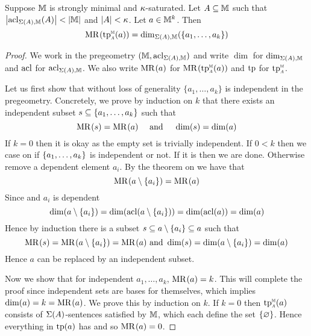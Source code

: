 \begin{prop}
    Suppose $\mathbb{M}$ is strongly minimal and $\kappa$-saturated. 
    Let $A \subseteq \mathbb{M}$ such that $\left\vert \operatorname{acl}_{\Sigma(A),\mathbb{M}}(A) \right\vert < \left\vert \mathbb{M} \right\vert$ 
    and $\left\vert A \right\vert < \kappa$.
    Let $a \in \mathbb{M}^k$. Then 
    \[\MR{}{\subintp{A}{\M}{\tp}(a)} = \dim_{\Si(A),\M}(\{a_1,\dots,a_k\})\]
\end{prop}
\begin{proof}
    We work in the pregeometry $(\mathbb{M},\operatorname{acl}_{\Sigma(A),\mathbb{M}})$ and write 
    $\dim$ for $\dim_{\Sigma(A),\mathbb{M}}$ and $\operatorname{acl}$ for $\operatorname{acl}_{\Sigma(A),\mathbb{M}}$.
    We also write $\mathrm{MR}^{}(a)$ for $\MR{}{\subintp{A}{\M}{\tp}(a)}$ and
    $\operatorname{tp}$ for $\subintp{A}{\M}{\tp}$.

    Let us first show that without loss of generality 
    $\{a_1,\dots,a_k\}$ is independent in the pregeometry.
    Concretely, we prove by induction on $k$ that there exists an independent
    subset $s \subseteq \left\{a_1,\dots,a_k\right\}$ such that 
    \[\mathrm{MR}^{}(s) = \mathrm{MR}^{}(a) \quad \text{ and } \quad \dim(s) = \dim(a)\]
    If $k = 0$ then it is okay as the empty set is trivially independent.
    If $0 < k$ then we case on if $\left\{a_1,\dots,a_k\right\}$ is independent
    or not.
    If it is then we are done. 
    Otherwise remove a dependent element $a_i$.
    By the theorem on  we have that 
    \[\mathrm{MR}^{}(a \setminus \left\{a_i\right\}) = \mathrm{MR}^{}(a)\]
    Since 
    and $a_i$ is dependent
    \[
        \dim(a \setminus \left\{a_i\right\}) = \dim(\operatorname{acl}(a \setminus \left\{a_i\right\}))
        = \dim(\operatorname{acl}(a)) = \dim(a)
    \]
    Hence by induction there is a subset $s \subseteq a \setminus \left\{a_i\right\} \subseteq a$
    such that 
    \[\mathrm{MR}^{}(s) = \mathrm{MR}^{}(a \setminus \left\{a_i\right\}) = \mathrm{MR}^{}(a)
    \text{ and } \dim(s) = \dim(a \setminus \left\{a_i\right\}) = \dim(a)\]
    Hence $a$ can be replaced by an independent subset.

    Now we show that for independent $a_1,\dots,a_k$, $\mathrm{MR}^{}(a) = k$.
    This will complete the proof since independent sets 
    are bases for themselves, which implies $\dim(a) = k = \mathrm{MR}^{}(a)$.
    We prove this by induction on $k$.
    If $k = 0$ then $\subintp{A}{\M}{\tp}(a)$ 
    consists of $\Sigma(A)$-sentences satisfied by $\mathbb{M}$, 
    which  each define the set 
    $\left\{\varnothing\right\}$. 
    Hence everything in $\operatorname{tp}(a)$ has 
    and so $\mathrm{MR}^{}(a) = 0$.


\end{proof}
